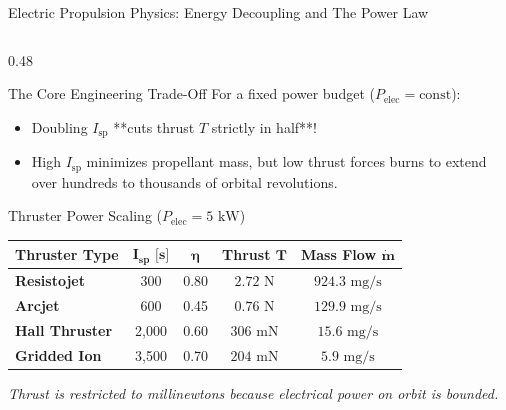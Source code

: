 \documentclass[aspectratio=169, 10pt]{beamer}
\begin{document}
\begin{frame}{Electric Propulsion Physics: Energy Decoupling and The Power Law}
\begin{columns}[T]
        \begin{column}{0.48\textwidth}
            \begin{exampleblock}{The Core Engineering Trade-Off}
                \scriptsize
                For a fixed power budget ($P_{\text{elec}} = \text{const}$):
                \begin{itemize}\setlength{\itemsep}{1.5pt}\setlength{\topsep}{0pt}
                    \item Doubling $I_{\text{sp}}$ **cuts thrust $T$ strictly in half**!
                    \item High $I_{\text{sp}}$ minimizes propellant mass, but low thrust forces burns to extend over hundreds to thousands of orbital revolutions.
                \end{itemize}
            \end{exampleblock}
            \vspace{-0.1cm}
            \begin{block}{Thruster Power Scaling ($P_{\text{elec}} = 5\text{ kW}$)}
                \centering
                \vspace{1pt}
                \fontsize{5.2pt}{6.2pt}\selectfont
                \setlength{\tabcolsep}{2.5pt}
                \renewcommand{\arraystretch}{1.2}
                \begin{tabular}{lcccc}
                    \toprule
                    \textbf{Thruster Type} & $\bm{I_{\text{sp}}\text{ [s]}}$ & $\bm{\eta}$ & \textbf{Thrust }$\bm{T}$ & \textbf{Mass Flow }$\bm{\dot{m}}$ \\ \midrule
                    \textbf{Resistojet}    & 300   & 0.80 & $2.72\text{ N}$   & $924.3\text{ mg/s}$ \\
                    \textbf{Arcjet}        & 600   & 0.45 & $0.76\text{ N}$   & $129.9\text{ mg/s}$ \\
                    \textbf{Hall Thruster} & 2,000 & 0.60 & $306\text{ mN}$   & $15.6\text{ mg/s}$  \\
                    \textbf{Gridded Ion}   & 3,500 & 0.70 & $204\text{ mN}$   & $5.9\text{ mg/s}$   \\
                    \bottomrule
                \end{tabular}
                \vspace{2pt}
            \end{block}
            \vspace{-0.1cm}
            \tiny \textcolor{Charcoal}{\textit{Thrust is restricted to millinewtons because electrical power on orbit is bounded.}}
        \end{column}
    \end{columns}
\end{frame}
\end{document}
